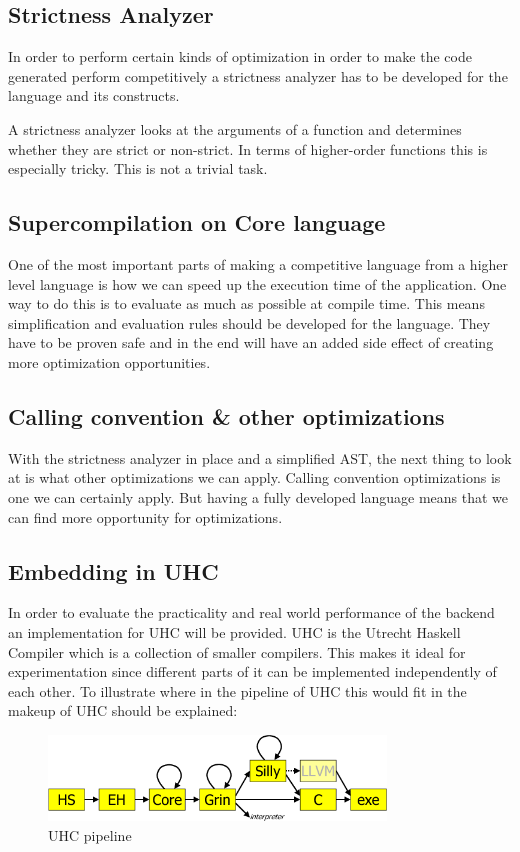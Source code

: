 \documentclass[11pt,twoside,a4paper]{article}
\begin{document}
\subsection{Strictness Analyzer}
In order to perform certain kinds of optimization in order to make the code generated perform competitively a strictness analyzer has to be developed for the language and its constructs. 

A strictness analyzer looks at the arguments of a function and determines whether they are strict or non-strict. In terms of higher-order functions this is especially tricky. 
This is not a trivial task. 

\subsection{Supercompilation on Core language}
One of the most important parts of making a competitive language from a higher level language is how we can speed up the execution time of the application. One way to do this is to evaluate as much as possible at compile time. This means simplification and evaluation rules should be developed for the language. They have to be proven safe and in the end will have an added side effect of creating more optimization opportunities.

\subsection{Calling convention \& other optimizations}
With the strictness analyzer in place and a simplified AST, the next thing to look at is what other optimizations we can apply.  Calling convention optimizations is one we can certainly apply. But having a fully developed language means that we can find more opportunity for optimizations.

\subsection{Embedding in UHC}
In order to evaluate the practicality and real world performance of the backend an implementation for UHC will be provided.  UHC is the Utrecht Haskell Compiler which is a collection of smaller compilers. This makes it ideal for experimentation since different parts of it can be implemented independently of each other. To illustrate where in the pipeline of UHC this would fit in the makeup of UHC should be explained:

\begin{figure}[h!]
  \centering
    \includegraphics[width=0.8\textwidth]{UHC}
  \caption{UHC pipeline}
\end{figure}
\end{document}
